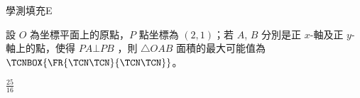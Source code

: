     \begin{QUESTION}
        \begin{ExamInfo}{94}{學測}{填充}{E}
        \end{ExamInfo}
        \begin{ExamAnsRateInfo}{13}{36}{3}{0}
        \end{ExamAnsRateInfo}
        \begin{QBODY}
            設 $O$ 為坐標平面上的原點，$P$ 點坐標為 $(2, 1)$；若 $A$, $B$ 分別是正 $x$-軸及正 $y$-軸上的點，使得 $PA \bot PB$ ，則 $\triangle OAB$ 面積的最大可能值為 $\TCNBOX{\FR{\TCN\TCN}{\TCN\TCN}}$。
        \end{QBODY}
        \begin{QFROMS}
        \end{QFROMS}
        \begin{QTAGS}\end{QTAGS}
        \begin{QANS}
            $\frac{25}{16}$
        \end{QANS}
        \begin{QSOLLIST}
        \end{QSOLLIST}
        \begin{QEMPTYSPACE}
        \end{QEMPTYSPACE}
    \end{QUESTION}
